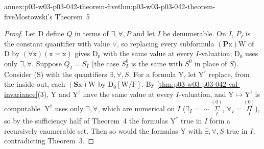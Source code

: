 \begin{annexitem}{annex:p03-w03-p03-042-theorem-five}{thm:p03-w03-p03-042-theorem-five}{Mostowski's Theorem~5}
\begin{proof}
Let \(\mathrm D\) define \(Q\) in terms of \(\exists,\forall,P\) and let
\(I\) be denumerable.  On \(I\), \(P_I\) is the constant quantifier with
value \(\vee\), so replacing every subformula \((\mathbf P\mathrm x)\mathrm
W\) of \(\mathrm D\) by \((\forall\mathrm x)(\mathrm x=\mathrm x)\) gives
\(\mathrm D_0\) with the same value at every \(I\)-valuation; \(\mathrm
D_0\) uses only \(\exists,\forall\).  Suppose \(Q_I=S_I\) (the case
\(S^0_I\) is the same with \(S^0\) in place of \(S\)).  Consider (S) with
the quantifiers \(\exists,\forall,S\).  For a formula \(\mathrm Y\), let
\(\mathrm Y^\dagger\) replace, from the inside out, each \((\mathbf
S\mathrm x)\mathrm W\) by \(\mathrm D_0[\mathrm W/\mathrm F]\).  By
\cref{thm:p03-w03-p03-042-val-invariance}(3), \(\mathrm Y\) and
\(\mathrm Y^\dagger\) have the same value at every \(I\)-valuation, and
\(\mathrm Y\mapsto\mathrm Y^\dagger\) is computable.  \(\mathrm Y^\dagger\)
uses only \(\exists,\forall\), which are numerical on \(I\)
(\(\exists_I={\sim}\overset{(0)}{\underset I\Sigma}\),
\(\forall_I=\overset{(0)}{\underset I\Pi}\)), so by the sufficiency half
of Theorem~4 the formulas \(\mathrm Y^\dagger\) true in \(I\) form a
recursively enumerable set.  Then so would the formulas \(\mathrm Y\) with
\(\exists,\forall,S\) true in \(I\), contradicting Theorem~3.
\end{proof}
\end{annexitem}

